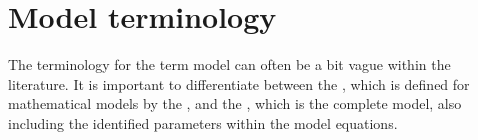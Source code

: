 \section{Model terminology} \label{sec:terminology}
The terminology for the term model can often be a bit vague within the literature.
It is important to differentiate between the , which is defined for mathematical models by the , and the , which is the complete model, also including the identified parameters within the model equations. 